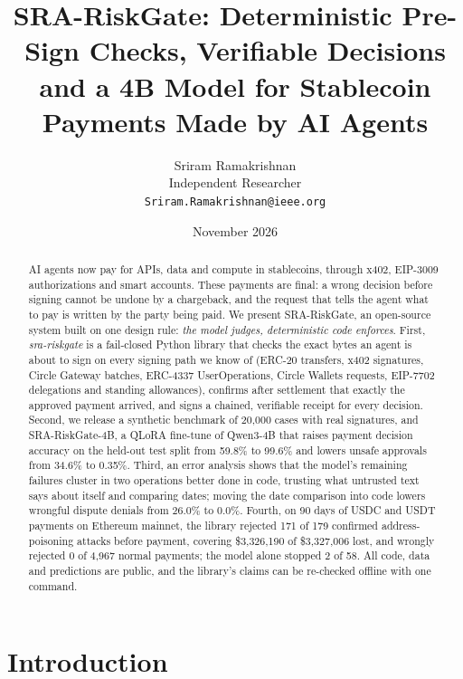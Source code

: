 \documentclass[11pt]{article}
\title{SRA-RiskGate: Deterministic Pre-Sign Checks, Verifiable Decisions and a 4B Model for Stablecoin Payments Made by AI Agents}
\author{Sriram Ramakrishnan\\Independent Researcher\\\texttt{Sriram.Ramakrishnan@ieee.org}}
\date{November 2026}
\begin{document}
\maketitle

\begin{abstract}
AI agents now pay for APIs, data and compute in stablecoins, through x402, EIP-3009 authorizations and smart accounts. These payments are final: a wrong decision before signing cannot be undone by a chargeback, and the request that tells the agent what to pay is written by the party being paid. We present SRA-RiskGate, an open-source system built on one design rule: \emph{the model judges, deterministic code enforces}. First, \emph{sra-riskgate} is a fail-closed Python library that checks the exact bytes an agent is about to sign on every signing path we know of (ERC-20 transfers, x402 signatures, Circle Gateway batches, ERC-4337 UserOperations, Circle Wallets requests, EIP-7702 delegations and standing allowances), confirms after settlement that exactly the approved payment arrived, and signs a chained, verifiable receipt for every decision. Second, we release a synthetic benchmark of 20,000 cases with real signatures, and SRA-RiskGate-4B, a QLoRA fine-tune of Qwen3-4B that raises payment decision accuracy on the held-out test split from 59.8\% to 99.6\% and lowers unsafe approvals from 34.6\% to 0.35\%. Third, an error analysis shows that the model's remaining failures cluster in two operations better done in code, trusting what untrusted text says about itself and comparing dates; moving the date comparison into code lowers wrongful dispute denials from 26.0\% to 0.0\%. Fourth, on 90 days of USDC and USDT payments on Ethereum mainnet, the library rejected 171 of 179 confirmed address-poisoning attacks before payment, covering \$3,326,190 of \$3,327,006 lost, and wrongly rejected 0 of 4,967 normal payments; the model alone stopped 2 of 58. All code, data and predictions are public, and the library's claims can be re-checked offline with one command.
\end{abstract}

\section{Introduction}
\end{document}

